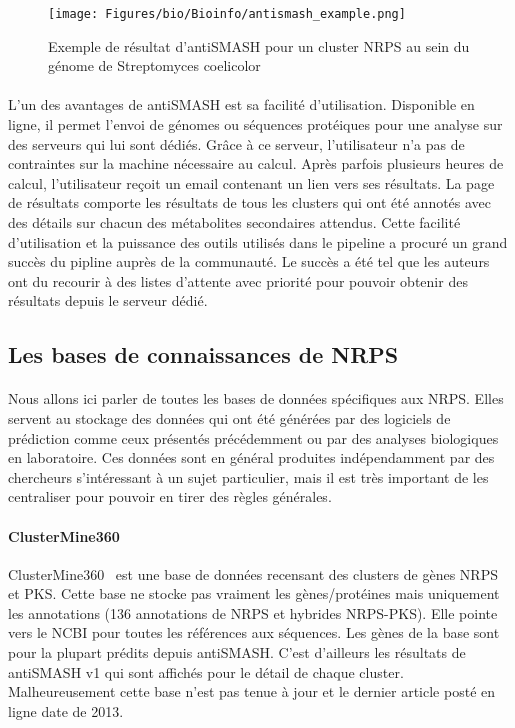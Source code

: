 \documentclass[12pt,french,twoside]{report}
\begin{document}
\begin{figure}
  \begin{center}
    \texttt{[image: Figures/bio/Bioinfo/antismash\_example.png]}
    \caption{\label{antismash_result}Exemple de résultat d'antiSMASH pour un cluster NRPS au sein du génome de Streptomyces coelicolor}
  \end{center}
\end{figure}

\paragraph{}L'un des avantages de antiSMASH est sa facilité d'utilisation.
Disponible en ligne, il permet l'envoi de génomes ou séquences protéiques pour une analyse sur des serveurs qui lui sont dédiés.
Grâce à ce serveur, l'utilisateur n'a pas de contraintes sur la machine nécessaire au calcul.
Après parfois plusieurs heures de calcul, l'utilisateur reçoit un email contenant un lien vers ses résultats.
La page de résultats comporte les résultats de tous les clusters qui ont été annotés avec des détails sur chacun des métabolites secondaires attendus.
Cette facilité d'utilisation et la puissance des outils utilisés dans le pipeline a procuré un grand succès du pipline auprès de la communauté.
Le succès a été tel que les auteurs ont du recourir à des listes d'attente avec priorité pour pouvoir obtenir des résultats depuis le serveur dédié.



\subsection{Les bases de connaissances de NRPS}

\paragraph{}Nous allons ici parler de toutes les bases de données spécifiques aux NRPS.
Elles servent au stockage des données qui ont été générées par des logiciels de prédiction comme ceux présentés précédemment ou par des analyses biologiques en laboratoire.
Ces données sont en général produites indépendamment par des chercheurs s'intéressant à un sujet particulier, mais il est très important de les centraliser pour pouvoir en tirer des règles générales.

\paragraph{ClusterMine360}
ClusterMine360~\cite{conway_clustermine360:_2013} est une base de données recensant des clusters de gènes NRPS et PKS.
Cette base ne stocke pas vraiment les gènes/protéines mais uniquement les annotations (136 annotations de NRPS et hybrides NRPS-PKS).
Elle pointe vers le NCBI pour toutes les références aux séquences.
Les gènes de la base sont pour la plupart prédits depuis antiSMASH.
C'est d'ailleurs les résultats de antiSMASH v1 qui sont affichés pour le détail de chaque cluster.
Malheureusement cette base n'est pas tenue à jour et le dernier article posté en ligne date de 2013.
\end{document}
